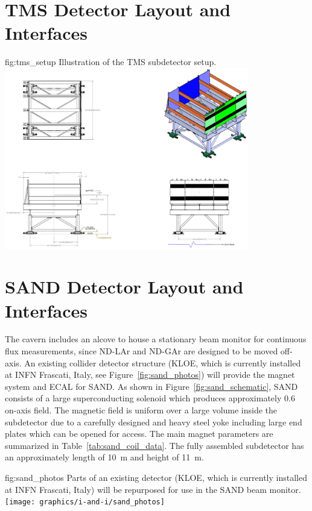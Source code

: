 \section{TMS Detector Layout and Interfaces}
\label{sec:int-inst-tms-layout}

\begin{dunefigure}{fig:tms_setup}
{Illustration of the TMS subdetector setup.}
\includegraphics[width=0.8\textwidth]{graphics/i-and-i/tms_setup}
\end{dunefigure}


\section{SAND Detector Layout and Interfaces}
\label{sec:int-inst-sand-layout}

The  cavern includes an alcove to house a stationary beam monitor for continuous flux measurements, since ND-LAr  and ND-GAr are designed to be moved off-axis. An existing collider detector structure (KLOE, which is currently installed at INFN Frascati, Italy, see Figure~\ref{fig:sand_photos}) will provide the magnet system and ECAL for SAND. As shown in Figure~\ref{fig:sand_schematic}, SAND consists of a large superconducting solenoid which produces approximately \SI{0.6}{\T} on-axis field. The magnetic field is uniform over a large volume inside the subdetector due to a carefully designed and heavy steel yoke including large end plates which can be opened for access. The main magnet parameters are summarized in Table~\ref{tab:sand_coil_data}. The fully assembled subdetector has an approximately length of \SI{10}{\m} and height of \SI{11}{\m}.

\begin{dunefigure}{fig:sand_photos}
{Parts of an existing detector (KLOE, which is currently installed at INFN Frascati, Italy) will be repurposed for use in the SAND beam monitor.}
\texttt{[image: graphics/i-and-i/sand\_photos]}
\end{dunefigure}


